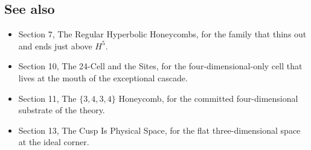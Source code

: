 \subsection{See also}

\begin{itemize}
\item Section 7, The Regular Hyperbolic Honeycombs, for the family that thins out and ends just above $H^5$.
\item Section 10, The 24-Cell and the Sites, for the four-dimensional-only cell that lives at the mouth of the exceptional cascade.
\item Section 11, The $\{3,4,3,4\}$ Honeycomb, for the committed four-dimensional substrate of the theory.
\item Section 13, The Cusp Is Physical Space, for the flat three-dimensional space at the ideal corner.
\end{itemize}

